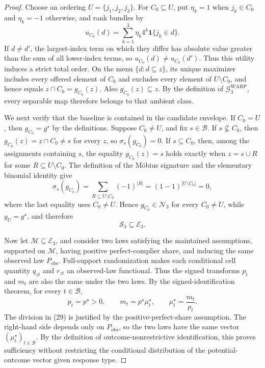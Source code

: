 \documentclass{article}
\begin{document}
\begin{proof}
Choose an ordering \(U=\{j_1,j_2,j_3\}\).  For \(C_0\subseteq U\), put \(\eta_k=1\) when \(j_k\in C_0\) and \(\eta_k=-1\) otherwise, and rank bundles by
\[
u_{C_0}(d)=\sum_{k=1}^3 \eta_k4^k\mathbf 1\{j_k\in d\}.
\]
If \(d\ne d'\), the largest-index term on which they differ has absolute value greater than the sum of all lower-index terms, so \(u_{C_0}(d)\ne u_{C_0}(d')\).  Thus this utility induces a strict total order.  On the menu \(\{d:d\subseteq z\}\), its unique maximizer includes every offered element of \(C_0\) and excludes every element of \(U\setminus C_0\), and hence equals \(z\cap C_0=g_{C_0}(z)\).  Also \(g_{C_0}(z)\subseteq z\).  By the definition of \(\mathcal G^{\mathrm{WARP}}_3\), every separable map therefore belongs to that ambient class.

We next verify that the baseline is contained in the candidate envelope.  If \(C_0=U\), then \(g_{C_0}=g^\star\) by the definitions.  Suppose \(C_0\ne U\), and fix \(s\in\mathcal B\).  If \(s\not\subseteq C_0\), then \(g_{C_0}(z)=z\cap C_0\ne s\) for every \(z\), so \(\sigma_s(g_{C_0})=0\).  If \(s\subseteq C_0\), then, among the assignments containing \(s\), the equality \(g_{C_0}(z)=s\) holds exactly when \(z=s\cup R\) for some \(R\subseteq U\setminus C_0\).  The definition of the Möbius signature and the elementary binomial identity give
\[
\sigma_s(g_{C_0})
=\sum_{R\subseteq U\setminus C_0}(-1)^{|R|}
=(1-1)^{|U\setminus C_0|}=0,
\]
where the last equality uses \(C_0\ne U\).  Hence \(g_{C_0}\in\mathcal N_3\) for every \(C_0\ne U\), while \(g_U=g^\star\), and therefore
\[
\mathcal S_3\subseteq\mathcal E_3. \tag{28}
\]

Now let \(\mathcal M\subseteq\mathcal E_3\), and consider two laws satisfying the maintained assumptions, supported on \(\mathcal M\), having positive perfect-complier share, and inducing the same observed law \(P_{\mathrm{obs}}\).  Full-support randomization makes each conditional cell quantity \(q_{zt}\) and \(r_{zt}\) an observed-law functional.  Thus the signed transforms \(p_t\) and \(m_t\) are also the same under the two laws.  By the signed-identification theorem, for every \(t\in\mathcal B\),
\[
p_t=p^\star>0,
\qquad
m_t=p^\star\mu_t^\star,
\qquad
\mu_t^\star=\frac{m_t}{p_t}. \tag{29}
\]
The division in (29) is justified by the positive-perfect-share assumption.  The right-hand side depends only on \(P_{\mathrm{obs}}\), so the two laws have the same vector \((\mu_t^\star)_{t\in\mathcal B}\).  By the definition of outcome-nonrestrictive identification, this proves sufficiency without restricting the conditional distribution of the potential-outcome vector given response type.


\end{proof}
\end{document}
